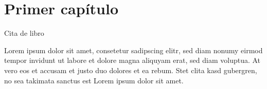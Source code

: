 
\chapter{Primer capítulo}\label{ch:primer-capitulo}

Cita de libro \cite{Euler1982, Euler1984, Euler1985}



Lorem ipsum dolor sit amet, consetetur sadipscing elitr, sed diam nonumy eirmod
tempor invidunt ut labore et dolore magna aliquyam erat, sed diam voluptua. At
vero eos et accusam et justo duo dolores et ea rebum. Stet clita kasd gubergren,
no sea takimata sanctus est Lorem ipsum dolor sit amet.

\endinput
